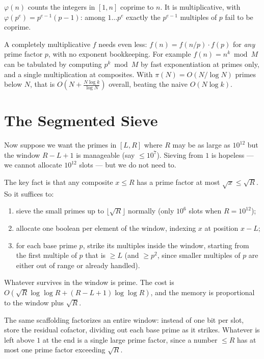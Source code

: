 \documentclass[11pt]{article}
\begin{document}
\begin{examplebox}
$\varphi(n)$ counts the integers in $[1, n]$ coprime to $n$. It is
multiplicative, with $\varphi(p^e) = p^{e-1}(p-1)$: among $1 \ldots p^e$ exactly
the $p^{e-1}$ multiples of $p$ fail to be coprime.
\end{examplebox}

A completely multiplicative $f$ needs even less: $f(n) = f(n/p) \cdot f(p)$ for
\emph{any} prime factor $p$, with no exponent bookkeeping. For example
$f(n) = n^{k} \bmod M$ can be tabulated by computing $p^{k} \bmod M$ by fast
exponentiation at primes only, and a single multiplication at composites. With
$\pi(N) = O(N / \log N)$ primes below $N$, that is
$O\!\left(N + \frac{N \log k}{\log N}\right)$ overall, beating the naive
$O(N \log k)$.

\section{The Segmented Sieve}

Now suppose we want the primes in $[L, R]$ where $R$ may be as large as
$10^{12}$ but the window $R - L + 1$ is manageable (say $\le 10^7$). Sieving
from $1$ is hopeless --- we cannot allocate $10^{12}$ slots --- but we do not
need to.

The key fact is that any composite $x \le R$ has a prime factor at most
$\sqrt{x} \le \sqrt{R}$. So it suffices to:
\begin{enumerate}[leftmargin=1.5em]
  \item sieve the small primes up to $\lfloor \sqrt{R} \rfloor$ normally
        (only $10^6$ slots when $R = 10^{12}$);
  \item allocate one boolean per element of the window, indexing $x$ at
        position $x - L$;
  \item for each base prime $p$, strike its multiples inside the window,
        starting from the first multiple of $p$ that is $\ge L$ (and
        $\ge p^2$, since smaller multiples of $p$ are either out of range or
        already handled).
\end{enumerate}
Whatever survives in the window is prime. The cost is
$O\!\left(\sqrt{R}\log\log R + (R - L + 1)\log\log R\right)$, and the memory is
proportional to the window plus $\sqrt{R}$.

\begin{notebox}
The same scaffolding factorizes an entire window: instead of one bit per slot,
store the residual cofactor, dividing out each base prime as it strikes.
Whatever is left above $1$ at the end is a single large prime factor, since a
number $\le R$ has at most one prime factor exceeding $\sqrt{R}$.
\end{notebox}
\end{document}
